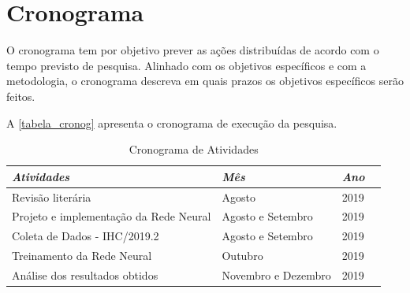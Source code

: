 \documentclass[
	12pt,				%
	openright,			%
	oneside,
	a4paper,			%
	english,			%
	french,				%
	spanish,			%
	brazil,				%
	]{abntex2}
\begin{document}


\chapter{Cronograma}

    O cronograma tem por objetivo prever as ações distribuídas de acordo com o tempo previsto de pesquisa. Alinhado com os objetivos específicos e com a metodologia, o cronograma descreva em quais prazos os objetivos específicos serão feitos.

A \autoref{tabela_cronog} apresenta o cronograma de execução da pesquisa. 

\begin{table}[!htb]
\centering
\caption{Cronograma de Atividades}
\label{tabela_cronog}
\begin{tabular}{@{}llll@{}}
\toprule
\textit{Atividades}                    & \textit{Mês}       & \textit{Ano}   \\ \midrule
Revisão literária                      & Agosto              & 2019      \\
Projeto e implementação da Rede Neural & Agosto e Setembro  & 2019      \\
Coleta de Dados - IHC/2019.2           & Agosto e Setembro  & 2019      \\
Treinamento da Rede Neural             & Outubro            & 2019      \\
Análise dos resultados obtidos          & Novembro e Dezembro& 2019      \\
                                \bottomrule
\end{tabular}
\end{table}










\postextual
\end{document}
